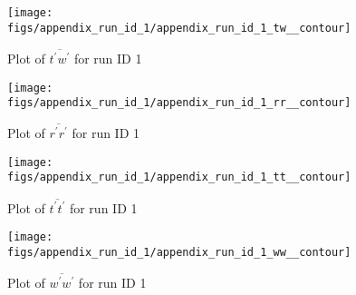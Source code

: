 \begin{figure}[H]
\centering
\texttt{[image: figs/appendix\_run\_id\_1/appendix\_run\_id\_1\_tw\_\_contour]}
\caption{Plot of $\overline{t^\prime w^\prime}$ for run ID 1}
\label{fig:appendix_run_id_1_tw__contour}
\end{figure}


\begin{figure}[H]
\centering
\texttt{[image: figs/appendix\_run\_id\_1/appendix\_run\_id\_1\_rr\_\_contour]}
\caption{Plot of $\overline{r^\prime r^\prime}$ for run ID 1}
\label{fig:appendix_run_id_1_rr__contour}
\end{figure}


\begin{figure}[H]
\centering
\texttt{[image: figs/appendix\_run\_id\_1/appendix\_run\_id\_1\_tt\_\_contour]}
\caption{Plot of $\overline{t^\prime t^\prime}$ for run ID 1}
\label{fig:appendix_run_id_1_tt__contour}
\end{figure}


\begin{figure}[H]
\centering
\texttt{[image: figs/appendix\_run\_id\_1/appendix\_run\_id\_1\_ww\_\_contour]}
\caption{Plot of $\overline{w^\prime w^\prime}$ for run ID 1}
\label{fig:appendix_run_id_1_ww__contour}
\end{figure}


